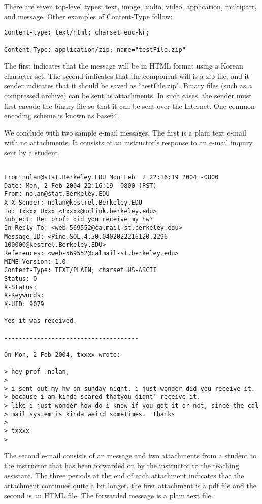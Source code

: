 \documentclass[12pt]{article}
\begin{document}
There are seven top-level types: text, image, audio, video, application,
multipart, and message.  Other examples of Content-Type follow:

\begin{verbatim}
Content-type: text/html; charset=euc-kr;

Content-Type: application/zip; name="testFile.zip"
\end{verbatim}

The first indicates that the message will be in HTML format using a
Korean character set.  The second indicates that the component will
is a zip file, and it sender indicates that it should be saved as
``testFile.zip".
Binary files (such as a compressed archive) can be
sent as attachments. 
In such cases, the sender must first encode the binary
file so that it can be sent over the Internet. 
One common encoding scheme is known as base64. 

We conclude with two sample e-mail messages.
The first is a plain text e-mail with no
attachments.  It consists of an instructor's response
to an e-mail inquiry sent by a student. 

\begin{verbatim}
 
From nolan@stat.Berkeley.EDU Mon Feb  2 22:16:19 2004 -0800
Date: Mon, 2 Feb 2004 22:16:19 -0800 (PST)
From: nolan@stat.Berkeley.EDU
X-X-Sender: nolan@kestrel.Berkeley.EDU
To: Txxxx Uxxx <txxxx@uclink.berkeley.edu>
Subject: Re: prof: did you receive my hw?
In-Reply-To: <web-569552@calmail-st.berkeley.edu>
Message-ID: <Pine.SOL.4.50.0402022216120.2296-100000@kestrel.Berkeley.EDU>
References: <web-569552@calmail-st.berkeley.edu>
MIME-Version: 1.0
Content-Type: TEXT/PLAIN; charset=US-ASCII
Status: O
X-Status:
X-Keywords:
X-UID: 9079
  
Yes it was received.
 
-------------------------------------
 
On Mon, 2 Feb 2004, txxxx wrote:
 
> hey prof .nolan,
>
> i sent out my hw on sunday night. i just wonder did you receive it.
> because i am kinda scared thatyou didnt' receive it.
> like i just wonder how do i know if you got it or not, since the cal
> mail system is kinda weird sometimes.  thanks
>
> txxxx
>
\end{verbatim}    

The second e-mail consists of an message and two attachments from
a student to the instructor that has been forwarded on by the 
instructor to the teaching assistant.
The three periods at the end of each attachment indicates
that the attachment continues quite a bit longer.
the first attachment is a pdf file and the second is an HTML file.
The forwarded message is a plain text file.
\end{document}
